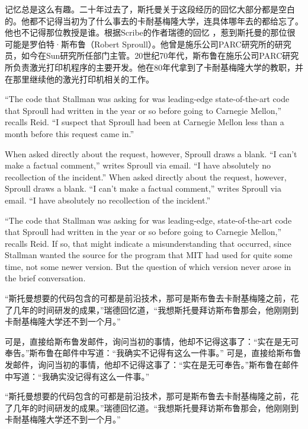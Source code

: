 \ifdefined\chs
记忆总是这么有趣。二十年过去了，斯托曼关于这段经历的回忆大部分都是空白的。他都不记得当初为了什么事去的卡耐基梅隆大学，连具体哪年去的都给忘了。他也不记得那位教授是谁。根据Scribe的作者瑞德的回忆 ，惹到斯托曼的那位很可能是罗伯特·斯布鲁（Robert Sproull）。他曾是施乐公司PARC研究所的研究员，如今在Sun研究所任部门主管。20世纪70年代，斯布鲁在施乐公司PARC研究所负责激光打印机程序的主要开发。他在80年代拿到了卡耐基梅隆大学的教职，并在那里继续他的激光打印机相关的工作。
\fi

\ifdefined\eng
\ifdefined\vone
``The code that Stallman was asking for was leading-edge state-of-the-art code that Sproull had written in the year or so before going to Carnegie Mellon,'' recalls Reid. ``I suspect that Sproull had been at Carnegie Mellon less than a month before this request came in.''

When asked directly about the request, however, Sproull draws a blank. ``I can't make a factual comment,'' writes Sproull via email. ``I have absolutely no recollection of the incident.''
\fi
\ifdefined\vtwo
When asked directly about the request, however, Sproull draws a blank. ``I can't make a factual comment,'' writes Sproull via email. ``I have absolutely no recollection of the incident.''

``The code that Stallman was asking for was leading-edge, state-of-the-art code that Sproull had written in the year or so before going to Carnegie Mellon,'' recalls Reid. If so, that might indicate a misunderstanding that occurred, since Stallman wanted the source for the program that MIT had used for quite some time, not some newer version. But the question of which version never arose in the brief conversation.
\fi
\fi

\ifdefined\chs
\ifdefined\vone
``斯托曼想要的代码包含的可都是前沿技术，那可是斯布鲁去卡耐基梅隆之前，花了几年的时间研发的成果，''瑞德回忆道，``我想斯托曼拜访斯布鲁那会，他刚刚到卡耐基梅隆大学还不到一个月。''

可是，直接给斯布鲁发邮件，询问当初的事情，他却不记得这事了：``实在是无可奉告。''斯布鲁在邮件中写道：``我确实不记得有这么一件事。''
\fi
\ifdefined\vtwo
可是，直接给斯布鲁发邮件，询问当初的事情，他却不记得这事了：``实在是无可奉告。''斯布鲁在邮件中写道：``我确实没记得有这么一件事。''

``斯托曼想要的代码包含的可都是前沿技术，那可是斯布鲁去卡耐基梅隆之前，花了几年的时间研发的成果。''瑞德回忆道。``我想斯托曼拜访斯布鲁那会，他刚刚到卡耐基梅隆大学还不到一个月。''
\fi
\fi


